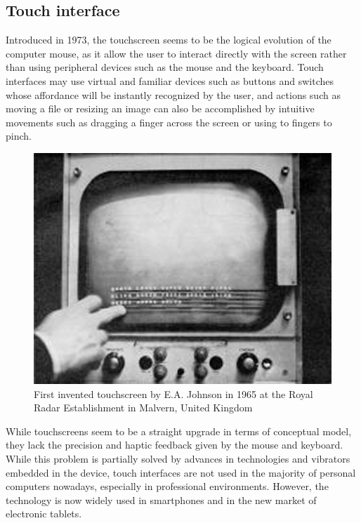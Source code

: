 \documentclass[a4paper,11pt] {article}
\theoremstyle{definition}
\begin{document}
    \subsection{Touch interface}

    Introduced in 1973, the touchscreen seems to be the logical evolution of the computer mouse, as it allow the user to interact directly with the screen rather than using peripheral devices such as the mouse and the keyboard. Touch interfaces may use virtual and familiar devices such as buttons and switches whose affordance will be instantly recognized by the user, and actions such as moving a file or resizing an image can also be accomplished by intuitive movements such as dragging a finger across the screen or using to fingers to pinch.\\
\begin{figure}[!h]
\centering
\includegraphics[scale=2]{fig-report/first-touchscreen.jpg}
\caption{First invented touchscreen by E.A. Johnson in 1965 at the Royal Radar Establishment in Malvern, United Kingdom\cite{first-touchscreen}}
\end{figure}
    While touchscreens seem to be a straight upgrade in terms of conceptual model, they lack the precision and haptic feedback given by the mouse and keyboard. While this problem is partially solved by advances in technologies and vibrators embedded in the device, touch interfaces are not used in the majority of personal computers nowadays, especially in professional environments. However, the technology is now widely used in smartphones and in the new market of electronic tablets.
\end{document}
